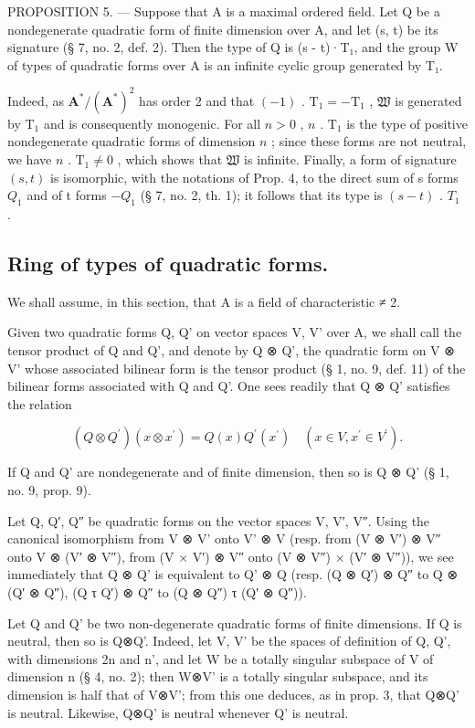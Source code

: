 PROPOSITION 5. --- Suppose that A is a maximal ordered field. Let Q be a nondegenerate quadratic form of finite dimension over A, and let (s, t) be its signature (§ 7, no. 2, def. 2). Then the type of Q is (s - t)·T₁, and the group W of types of quadratic forms over A is an infinite cyclic group generated by T₁.

Indeed, as \(\mathbf{A}^{*}/(\mathbf{A}^{*})^{2}\) has order 2 and that \((-1)\) . \(\mathrm{T}_{1} = -\mathrm{T}_{1}\) , \(\mathfrak{W}\) is generated by \(\mathrm{T}_{1}\) and is consequently monogenic. For all \(n > 0\) , \(n\) . \(\mathrm{T}_{1}\) is the type of positive nondegenerate quadratic forms of dimension \(n\) ; since these forms are not neutral, we have \(n\) . \(\mathrm{T}_{1} \neq 0\) , which shows that \(\mathfrak{W}\) is infinite. Finally, a form of signature \((s, t)\) is isomorphic, with the notations of Prop. 4, to the direct sum of s forms \(Q_{1}\) and of t forms \(-Q_{1}\) (§ 7, no. 2, th. 1); it follows that its type is \((s - t)\) . \(T_{1}\) .

\subsection{Ring of types of quadratic forms.}

We shall assume, in this section, that A is a field of characteristic ≠ 2.

Given two quadratic forms Q, Q' on vector spaces V, V' over A, we shall call the tensor product of Q and Q', and denote by Q ⊗ Q', the quadratic form on V ⊗ V' whose associated bilinear form is the tensor product (§ 1, no. 9, def. 11) of the bilinear forms associated with Q and Q'. One sees readily that Q ⊗ Q' satisfies the relation

\[
(Q \otimes Q ^ {\prime}) (x \otimes x ^ {\prime}) = Q (x) Q ^ {\prime} (x ^ {\prime}) \quad (x \in V, x ^ {\prime} \in V ^ {\prime}).\tag{5}
\]

If Q and Q' are nondegenerate and of finite dimension, then so is Q ⊗ Q' (§ 1, no. 9, prop. 9).

Let Q, Q′, Q″ be quadratic forms on the vector spaces V, V′, V″. Using the canonical isomorphism from V ⊗ V' onto V' ⊗ V (resp. from (V ⊗ V′) ⊗ V″ onto V ⊗ (V′ ⊗ V″), from (V × V′) ⊗ V″ onto (V ⊗ V″) × (V′ ⊗ V″)), we see immediately that Q ⊗ Q' is equivalent to Q' ⊗ Q (resp. (Q ⊗ Q′) ⊗ Q″ to Q ⊗ (Q′ ⊗ Q″), (Q τ Q′) ⊗ Q″ to (Q ⊗ Q″) τ (Q′ ⊗ Q″)).

Let Q and Q' be two non-degenerate quadratic forms of finite dimensions. If Q is neutral, then so is Q⊗Q'. Indeed, let V, V' be the spaces of definition of Q, Q', with dimensions 2n and n', and let W be a totally singular subspace of V of dimension n (§ 4, no. 2); then W⊗V' is a totally singular subspace, and its dimension is half that of V⊗V'; from this one deduces, as in prop. 3, that Q⊗Q' is neutral. Likewise, Q⊗Q' is neutral whenever Q' is neutral.

